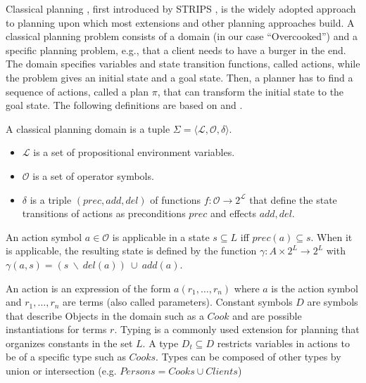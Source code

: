 Classical planning \citep{ghallabAutomatedPlanningTheory2004}, first introduced by STRIPS \citep{fikesSTRIPSNewApproach1971}, is the widely adopted approach to planning upon which most extensions and other planning approaches build.
A classical planning problem consists of a domain (in our case ``Overcooked'') and a specific planning problem, e.g., that a client needs to have a burger in the end.
The domain specifies variables and state transition functions, called actions, while the problem gives an initial state and a goal state.
Then, a planner has to find a sequence of actions, called a plan $\pi$, that can transform the initial state to the goal state.
The following definitions are based on \cite{ghallabAutomatedPlanningTheory2004} and \cite{hollerGuidingSearchHTN2019}.

\begin{definition}
  A classical planning domain is a tuple $\Sigma=\langle \mathcal{L}, \mathcal{O}, \delta \rangle$.
  \begin{itemize}
    \item $\mathcal{L}$ is a set of propositional environment variables. 
    \item $\mathcal{O}$ is a set of operator symbols.
    \item $\delta$ is a triple $(prec, add, del )$ of functions $f: \mathcal{O} \rightarrow 2^\mathcal{L}$ that define the state transitions of actions as preconditions $prec$ and effects $add, del$.
  \end{itemize}
  An action symbol $a \in \mathcal{O}$ is applicable in a state $s \subseteq L$ iff $prec(a) \subseteq s$. When it is applicable, the resulting state is defined by the function $\gamma: A \times 2^L \rightarrow 2^L$ with $\gamma(a,s) = (s~\backslash~del(a))~\cup~add(a)$.
\end{definition}

An action is an expression of the form $a(r_1,\dots,r_n)$ where $a$ is the action symbol and $r_1,\dots,r_n$ are terms (also called parameters).
Constant symbols $D$ are symbols that describe Objects in the domain such as a $Cook$ and are possible instantiations for terms $r$.
Typing is a commonly used extension for planning that organizes constants in the set $L$.
A type $D_t \subseteq D$ restricts variables in actions to be of a specific type such as $Cooks$.
Types can be composed of other types by union or intersection (e.g. $Persons=Cooks\cup Clients$)

